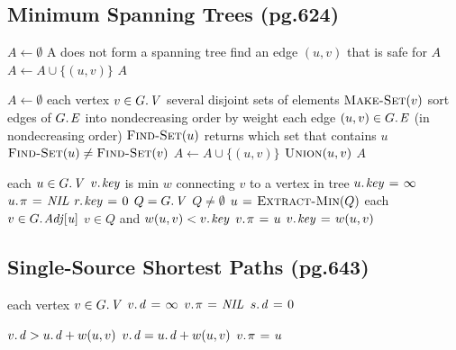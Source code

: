 \documentclass[twocolumn]{article}
\begin{document}
\subsection{Minimum Spanning Trees (pg.624)}
\begin{codebox}
\li $A \gets \emptyset$
\li \While A does not form a spanning tree
\li \Do find an edge $(u,v)$ that is safe for $A$
\li 		$A \gets A \cup \{ (u,v)\}$
	\End
\li \Return $A$
\end{codebox}

\begin{codebox}
\li $A \gets \emptyset$
\li \For each vertex $v \in \attrib{G}{V}$
\li \Do \Comment several disjoint sets of elements
\li 		$\textnormal{\scshape Make-Set}(v)$
	\End
\li sort edges of $\attrib{G}{E}$ into nondecreasing order by weight
\li \For each edge $(u,v) \in \attrib{G}{E}$ (in nondecreasing order)
\li \Do \Comment $\textnormal{\scshape Find-Set}(u)$ returns which set that contains $u$
\li 		\If $\textnormal{\scshape Find-Set}(u) \neq \textnormal{\scshape Find-Set}(v)$
\li 		\Then $A \gets A \cup \{ (u,v)\}$
\li 			  $\textnormal{\scshape Union}(u,v)$
		\End
	\End
\li \Return $A$
\end{codebox}

\begin{codebox}
\li \For each $u \in \attrib{G}{V}$
\li \Do \Comment $\attrib{v}{key}$ is min $w$ connecting $v$ to a vertex in tree
\li 		$\attrib{u}{key} \gets \infty$
\li 		$\attrib{u}{\pi} \gets \id{NIL}$
	\End
\li $\attrib{r}{key} \gets 0$
\li $Q = \attrib{G}{V}$
\li \While $Q \neq \emptyset$
\li \Do $u \mathrel{\hspace{1pt}=\hspace{1pt}} \textnormal{\scshape Extract-Min}(Q)$
\li 		\For each $v \in \attrib{G}{Adj[u]}$
\li 		\Do \If $v \in Q$ and $w(u,v) < \attrib{v}{key}$
\li 			\Then $\attrib{v}{\pi} \gets u$
\li 				  $\attrib{v}{key} \gets w(u,v)$
			\End
		\End
	\End
\end{codebox}

\subsection{Single-Source Shortest Paths (pg.643)}
\begin{codebox}
\li \For each vertex $v \in \attrib{G}{V}$
\li \Do $\attrib{v}{d} \gets \infty$
\li 		$\attrib{v}{\pi} \gets \id{NIL}$
	\End
\li $\attrib{s}{d} \gets 0$
\end{codebox}

\begin{codebox}
\li \If $\attrib{v}{d} > \attrib{u}{d} + w(u,v)$
\li \Do $\attrib{v}{d} = \attrib{u}{d} + w(u,v)$
\li 		$\attrib{v}{\pi} \gets u$
	\End
\end{codebox}
\end{document}
